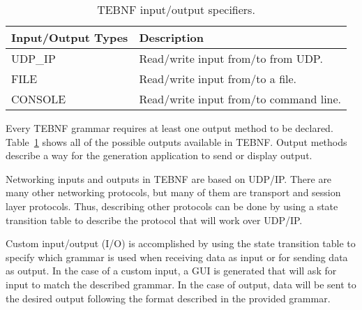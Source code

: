 \begin{table}[h]
\begin{center}
\caption{TEBNF input/output specifiers.}
\label{TEBNFInputAndOutputSpecifiers}
\begin{tabular}{|l|l|} \hline
\textbf{Input/Output Types} & \textbf{Description} \\ \hline \hline
UDP\_IP	& Read/write input from/to from UDP. \\ \hline
FILE	& Read/write input from/to a file. \\ \hline
CONSOLE	& Read/write input from/to command line. \\ \hline
\end{tabular}
\end{center}
\end{table}

\indent
Every TEBNF grammar requires at least one output method to be declared.  Table~\ref{TEBNFInputAndOutputSpecifiers} shows all of the possible outputs available in TEBNF.  Output methods describe a way for the generation application to send or display output.
 
\indent
Networking inputs and outputs in TEBNF are based on UDP/IP.  There are many other networking protocols, but many of them are transport and session layer protocols.  Thus, describing other protocols can be done by using a state transition table to describe the protocol that will work over UDP/IP.

\indent
Custom input/output (I/O) is accomplished by using the state transition table to specify which grammar is used when receiving data as input or for sending data as output.  In the case of a custom input, a GUI is generated that will ask for input to match the described grammar.  In the case of output, data will be sent to the desired output following the format described in the provided grammar.

